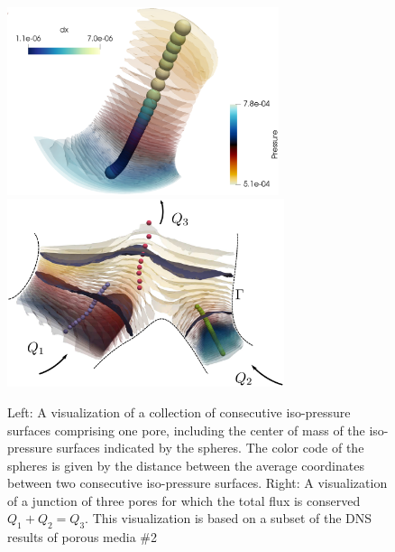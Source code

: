 \documentclass[draft]{agujournal2019}
\begin{document}
\begin{figure}[t!]
\includegraphics[height=5.5cm]{figures/example_pore_v2.eps}
\includegraphics[height=5.5cm]{figures/merging_pores_v2.eps}
\caption{Left: A visualization of a collection of consecutive iso-pressure surfaces comprising one pore, including the center of mass of the iso-pressure surfaces indicated by the spheres. The color code of the spheres is given by the distance between the average coordinates between two consecutive iso-pressure surfaces. Right: A visualization of a junction of three pores for which the total flux is conserved $Q_1+Q_2 = Q_3$. This visualization is based on a subset of the DNS results of porous media \#2}
\label{fig:isop_surfaces}
\end{figure}
\end{document}
